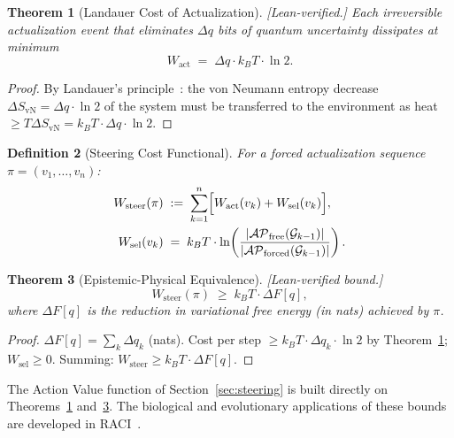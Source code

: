 \documentclass[11pt,a4paper]{article}
\newtheorem{theorem}{Theorem}[section]
\newtheorem{definition}[theorem]{Definition}
\theoremstyle{remark}
\newcommand{\AP}{\mathcal{AP}}
\newcommand{\GG}{\mathcal{G}}
\begin{document}
\begin{theorem}[Landauer Cost of Actualization]
\label{thm:landauer}
\textup{[Lean-verified.]}
Each irreversible actualization event that eliminates $\Delta q$ bits of quantum
uncertainty dissipates at minimum
\begin{equation}
  W_{\mathrm{act}} \;=\; \Delta q \cdot k_B T \cdot \ln 2.
  \label{eq:landauer_rahc}
\end{equation}
\end{theorem}

\begin{proof}
By Landauer's principle~\citep{Landauer1961}: the von Neumann entropy decrease
$\Delta S_{\mathrm{vN}} = \Delta q \cdot \ln 2$ of the system must be transferred
to the environment as heat $\geq T \Delta S_{\mathrm{vN}} = k_B T \cdot \Delta q
\cdot \ln 2$.
\end{proof}

\begin{definition}[Steering Cost Functional]
\label{def:steering}
For a forced actualization sequence $\pi = (v_1, \ldots, v_n)$:
\begin{align}
  W_{\mathrm{steer}}(\pi)
  &\;:=\;
  \sum_{k=1}^{n}
  \Bigl[ W_{\mathrm{act}}(v_k) + W_{\mathrm{sel}}(v_k) \Bigr],
  \label{eq:Wsteer_rahc} \\
  W_{\mathrm{sel}}(v_k)
  &\;=\;
  k_B T \cdot \ln\!\left(
    \frac{|\AP_{\mathrm{free}}(\GG_{k-1})|}{|\AP_{\mathrm{forced}}(\GG_{k-1})|}
  \right).
  \label{eq:Wsel_rahc}
\end{align}
\end{definition}

\begin{theorem}[Epistemic-Physical Equivalence]
\label{thm:steering}
\textup{[Lean-verified bound.]}
\begin{equation}
  W_{\mathrm{steer}}(\pi) \;\geq\; k_B T \cdot \Delta F[q],
  \label{eq:EPE_rahc}
\end{equation}
where $\Delta F[q]$ is the reduction in variational free energy (in nats) achieved
by $\pi$.
\end{theorem}

\begin{proof}
$\Delta F[q] = \sum_k \Delta q_k$ (nats). Cost per step $\geq k_B T \cdot \Delta
q_k \cdot \ln 2$ by Theorem~\ref{thm:landauer}; $W_{\mathrm{sel}} \geq 0$.
Summing: $W_{\mathrm{steer}} \geq k_B T \cdot \Delta F[q]$.
\end{proof}

The Action Value function of Section~\ref{sec:steering} is built directly on
Theorems~\ref{thm:landauer} and~\ref{thm:steering}. The biological and
evolutionary applications of these bounds are developed in
RACI~\citep{Sandeman2026c}.
\end{document}
